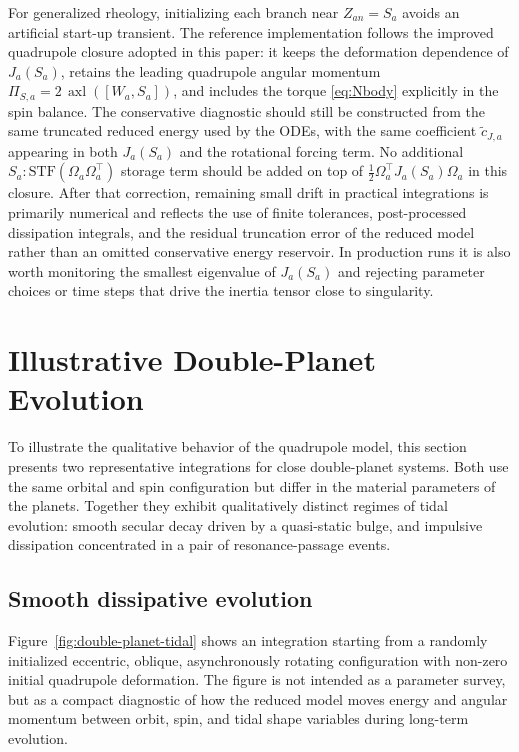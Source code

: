 \documentclass[journal, a4paper]{IEEEtran}
\begin{document}
For generalized rheology, initializing each branch near $Z_{an}=S_a$ avoids an
artificial start-up transient. The reference implementation follows the
improved quadrupole closure adopted in this paper: it keeps the deformation
dependence of $J_a(S_a)$, retains the leading quadrupole angular momentum
$\Pi_{S,a}=2\,\operatorname{axl}([W_a,S_a])$, and includes the torque
\eqref{eq:Nbody} explicitly in the spin balance. The conservative diagnostic
should still be constructed from the same truncated reduced energy used by the
ODEs, with the same coefficient $\tilde c_{J,a}$ appearing in both
$J_a(S_a)$ and the rotational forcing term. No additional
$S_a:\mathrm{STF}(\Omega_a\Omega_a^\top)$ storage term should be added on top of
$\frac{1}{2}\Omega_a^\top J_a(S_a)\Omega_a$ in this closure. After that
correction, remaining small drift in practical integrations is primarily
numerical and reflects the use of finite tolerances, post-processed
dissipation integrals, and the residual truncation error of the reduced model
rather than an omitted conservative energy reservoir. In production runs it is also worth monitoring the smallest eigenvalue of
$J_a(S_a)$ and rejecting parameter choices or time steps that drive the
inertia tensor close to singularity.

\section{Illustrative Double-Planet Evolution}

To illustrate the qualitative behavior of the quadrupole model, this section
presents two representative integrations for close double-planet systems. Both
use the same orbital and spin configuration but differ in the material
parameters of the planets. Together they exhibit qualitatively distinct
regimes of tidal evolution: smooth secular decay driven by a quasi-static
bulge, and impulsive dissipation concentrated in a pair of resonance-passage
events.

\subsection{Smooth dissipative evolution}

Figure~\ref{fig:double-planet-tidal} shows an integration starting from
a randomly initialized eccentric, oblique, asynchronously rotating
configuration with non-zero initial quadrupole deformation. The figure is
not intended as a parameter survey, but as a compact diagnostic of how the
reduced model moves energy and angular momentum between orbit, spin, and
tidal shape variables during long-term evolution.
\end{document}
